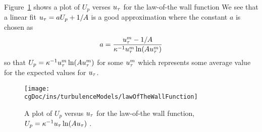 Figure~\ref{fig:lawOfTheWallFunction} shows a plot of $U_p$ verses $u_\tau$ for the law-of-the wall function
We see that a linear fit $u_\tau = a U_p + 1/A$ is a good approximation where the constant
$a$ is chosen as 
\[
   a = { u_\tau^m - 1/A \over \kappa^{-1}u_\tau^m \ln(A u_\tau^m)}
\]
so that $U_p = \kappa^{-1}u_\tau^m \ln(A u_\tau^m)$ for some $u_\tau^m$ which represents some
average value for the expected values for $u_\tau$. 
\begin{figure}
\begin{center}
  \texttt{[image: \\cgDoc/ins/turbulenceModels/lawOfTheWallFunction]}
\end{center}
\caption{A plot of $U_p$ versus $u_\tau$ for the law-of-the wall function,
             $U_p = \kappa^{-1}u_\tau \ln(A u_\tau)$ .}
\label{fig:lawOfTheWallFunction}
\end{figure}


% 

